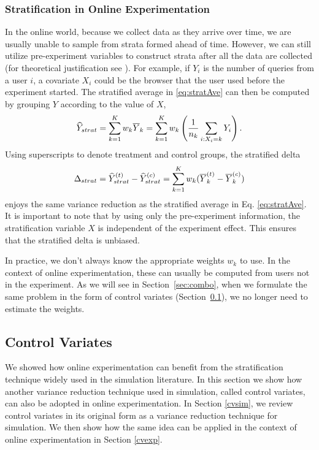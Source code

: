 \documentclass{sig-alternate}
\begin{document}
\subsubsection{Stratification in Online Experimentation}\label{sec:stratExp}
In the online world, because we collect data as they arrive over time, we are usually unable to sample from strata formed ahead of time. However, we can still utilize pre-experiment variables to construct strata after all the data are collected (for theoretical justification see \citet[Page 153]{stosim}). For example, if $Y_i$ is the number of queries from a user $i$, a covariate $X_i$ could be the browser that the user used before the experiment started. The stratified average in \eqref{eq:stratAve} can then be computed by grouping $Y$ according to the value of $X$,
\begin{align*}
\widehat{Y}_{strat} = \sum_{k=1}^K w_k\overline{Y}_k = \sum_{k=1}^K w_k \left(\frac{1}{n_k}\sum_{i:X_i=k}Y_i\right).
\end{align*}
Using superscripts to denote treatment and control groups, 
the stratified delta
\begin{align*}
\Delta_{strat} = \widehat{Y}_{strat}^{(t)} - \widehat{Y}_{strat}^{(c)} = \sum_{k=1}^K w_k(\overline{Y}_k^{(t)}-\overline{Y}_k^{(c)})
\end{align*}
enjoys the same variance reduction as the stratified average in Eq. \eqref{eq:stratAve}.
It is important to note that by using only the pre-experiment information, the stratification variable $X$ is independent of the experiment effect. This ensures that the stratified delta is unbiased.




In practice, we don't always know the appropriate weights $w_k$ to use. In the context of online experimentation, these can usually be computed from users not in the experiment. As we will see in Section~\ref{sec:combo}, when we formulate the same problem in the form of control variates (Section~\ref{sec:cv}), we no longer need to estimate the weights.   


\subsection{Control Variates}\label{sec:cv}
We showed how online experimentation can benefit from the stratification technique widely used in the simulation literature. In this section we show how another variance reduction technique used in simulation, called control variates, can also be adopted in online experimentation. In Section \ref{cvsim}, we review control variates in its original form as a variance reduction technique for simulation. We then show how the same idea can be applied in the context of online experimentation in Section \ref{cvexp}. 
\end{document}
